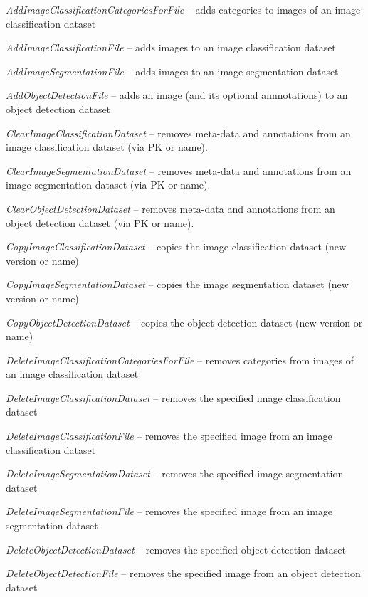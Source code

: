 \documentclass[a4paper]{book}
\begin{document}
\begin{tight_itemize}
  \item \textit{AddImageClassificationCategoriesForFile} -- adds categories to images of an image classification dataset
  \item \textit{AddImageClassificationFile} -- adds images to an image classification dataset
  \item \textit{AddImageSegmentationFile} -- adds images to an image segmentation dataset
  \item \textit{AddObjectDetectionFile} -- adds an image (and its optional annnotations) to an object detection dataset
  \item \textit{ClearImageClassificationDataset} -- removes meta-data and annotations from an image classification dataset (via PK or name).
  \item \textit{ClearImageSegmentationDataset} -- removes meta-data and annotations from an image segmentation dataset (via PK or name).
  \item \textit{ClearObjectDetectionDataset} -- removes meta-data and annotations from an object detection dataset (via PK or name).
  \item \textit{CopyImageClassificationDataset} -- copies the image classification dataset (new version or name)
  \item \textit{CopyImageSegmentationDataset} -- copies the image segmentation dataset (new version or name)
  \item \textit{CopyObjectDetectionDataset} -- copies the object detection dataset (new version or name)
  \item \textit{DeleteImageClassificationCategoriesForFile} -- removes categories from images of an image classification dataset
  \item \textit{DeleteImageClassificationDataset} -- removes the specified image classification dataset
  \item \textit{DeleteImageClassificationFile} -- removes the specified image from an image classification dataset
  \item \textit{DeleteImageSegmentationDataset} -- removes the specified image segmentation dataset
  \item \textit{DeleteImageSegmentationFile} -- removes the specified image from an image segmentation dataset
  \item \textit{DeleteObjectDetectionDataset} -- removes the specified object detection dataset
  \item \textit{DeleteObjectDetectionFile} -- removes the specified image from an object detection dataset

\end{tight_itemize}
\end{document}
